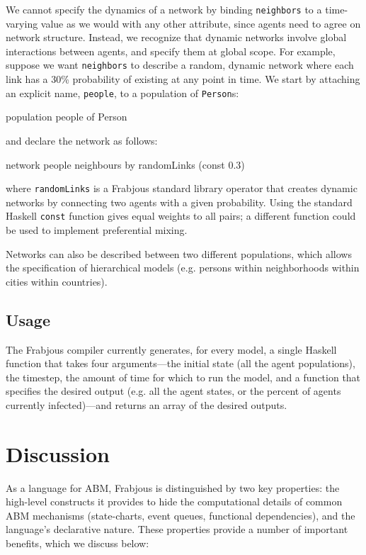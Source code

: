 \documentclass[oribibl]{llncs}
\begin{document}
  We cannot specify the dynamics of a network by binding \lstinline{neighbors} to a time-varying value as we would with any other attribute, since agents need to agree on network structure. Instead, we recognize that dynamic networks involve global interactions between agents, and specify them at global scope. 
   For example, suppose we want \lstinline{neighbors} to describe a random, dynamic network where each link has a 30\% probability of existing at any point in time. We start by attaching an explicit name, \lstinline{people}, to a population of \lstinline{Person}s: 
\begin{code}
	population people of Person
\end{code}
and declare the network as follows:
\begin{code}
	network people neighbours by randomLinks (const 0.3)
\end{code}
where \lstinline{randomLinks} is a Frabjous standard library operator that creates dynamic networks by connecting two agents with a given probability. Using the standard Haskell \lstinline{const} function gives equal weights to all pairs; a different function could be used to implement preferential mixing.

Networks can also be described between two different populations, which allows the specification of hierarchical models (e.g. persons within neighborhoods within cities within countries).  

\subsection{Usage}
The Frabjous compiler currently generates, for every model, a single Haskell function that takes four arguments---the initial state (all the agent populations), the timestep, the amount of time for which to run the model, and a function that specifies the desired output (e.g. all the agent states, or the percent of agents currently infected)---and returns an array of the desired outputs. 












\section{Discussion}
As a language for ABM, Frabjous is distinguished by two key properties: the high-level constructs it provides to hide the computational details of common ABM mechanisms (state-charts, event queues, functional dependencies), and the language's declarative nature. These properties provide a number of important benefits, which we discuss below:
\end{document}
